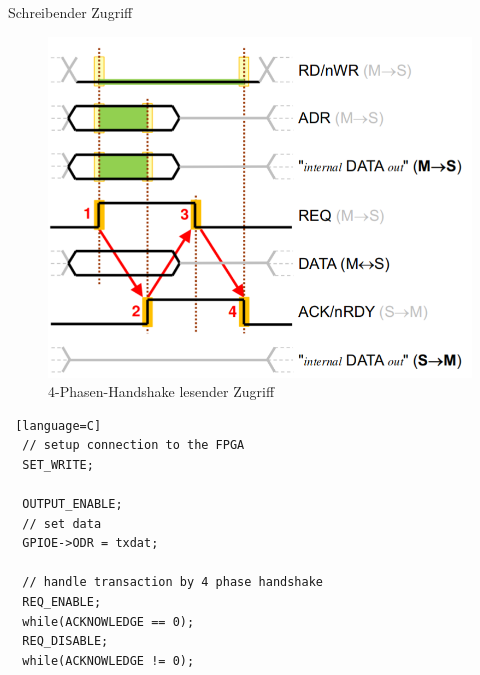   \begin{frame} {Schreibender Zugriff}
    \begin{figure}[ht]
      \centering
      \includegraphics[height=0.7\textheight]{figs/schreibender_zugriff.png}
      \caption{4-Phasen-Handshake lesender Zugriff}
    \end{figure}
  \end{frame}

  \begin{frame} [fragile]
    \begin{lstlisting} [language=C]
  // setup connection to the FPGA
  SET_WRITE;

  OUTPUT_ENABLE;
  // set data
  GPIOE->ODR = txdat;

  // handle transaction by 4 phase handshake
  REQ_ENABLE;
  while(ACKNOWLEDGE == 0);
  REQ_DISABLE;
  while(ACKNOWLEDGE != 0);
    \end{lstlisting}
  \end{frame}


